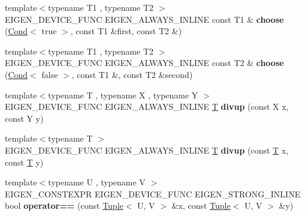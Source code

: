 \begin{DoxyCompactItemize}
\item 
\mbox{\label{namespace_eigen_a26b3e77015597ba6bae64bca8045daf3}} 
{\footnotesize template$<$typename T1 , typename T2 $>$ }\\E\+I\+G\+E\+N\+\_\+\+D\+E\+V\+I\+C\+E\+\_\+\+F\+U\+NC E\+I\+G\+E\+N\+\_\+\+A\+L\+W\+A\+Y\+S\+\_\+\+I\+N\+L\+I\+NE const T1 \& {\bfseries choose} (\hyperlink{struct_eigen_1_1_cond}{Cond}$<$ true $>$, const T1 \&first, const T2 \&)
\item 
\mbox{\label{namespace_eigen_a1d7a4ad7516a291186b45ca58f6cd3b2}} 
{\footnotesize template$<$typename T1 , typename T2 $>$ }\\E\+I\+G\+E\+N\+\_\+\+D\+E\+V\+I\+C\+E\+\_\+\+F\+U\+NC E\+I\+G\+E\+N\+\_\+\+A\+L\+W\+A\+Y\+S\+\_\+\+I\+N\+L\+I\+NE const T2 \& {\bfseries choose} (\hyperlink{struct_eigen_1_1_cond}{Cond}$<$ false $>$, const T1 \&, const T2 \&second)
\item 
\mbox{\label{namespace_eigen_a13ec9832931270b80961236d30f6d2e3}} 
{\footnotesize template$<$typename T , typename X , typename Y $>$ }\\E\+I\+G\+E\+N\+\_\+\+D\+E\+V\+I\+C\+E\+\_\+\+F\+U\+NC E\+I\+G\+E\+N\+\_\+\+A\+L\+W\+A\+Y\+S\+\_\+\+I\+N\+L\+I\+NE \hyperlink{group___sparse_core___module}{T} {\bfseries divup} (const X x, const Y y)
\item 
\mbox{\label{namespace_eigen_aa764c140980c11b0aa3b16f4fa5392f6}} 
{\footnotesize template$<$typename T $>$ }\\E\+I\+G\+E\+N\+\_\+\+D\+E\+V\+I\+C\+E\+\_\+\+F\+U\+NC E\+I\+G\+E\+N\+\_\+\+A\+L\+W\+A\+Y\+S\+\_\+\+I\+N\+L\+I\+NE \hyperlink{group___sparse_core___module}{T} {\bfseries divup} (const \hyperlink{group___sparse_core___module}{T} x, const \hyperlink{group___sparse_core___module}{T} y)
\item 
\mbox{\label{namespace_eigen_a78a75cc4b4fa5e0084f67f80ac854159}} 
{\footnotesize template$<$typename U , typename V $>$ }\\E\+I\+G\+E\+N\+\_\+\+C\+O\+N\+S\+T\+E\+X\+PR E\+I\+G\+E\+N\+\_\+\+D\+E\+V\+I\+C\+E\+\_\+\+F\+U\+NC E\+I\+G\+E\+N\+\_\+\+S\+T\+R\+O\+N\+G\+\_\+\+I\+N\+L\+I\+NE bool {\bfseries operator==} (const \hyperlink{struct_eigen_1_1_tuple}{Tuple}$<$ U, V $>$ \&x, const \hyperlink{struct_eigen_1_1_tuple}{Tuple}$<$ U, V $>$ \&y)

\end{DoxyCompactItemize}
